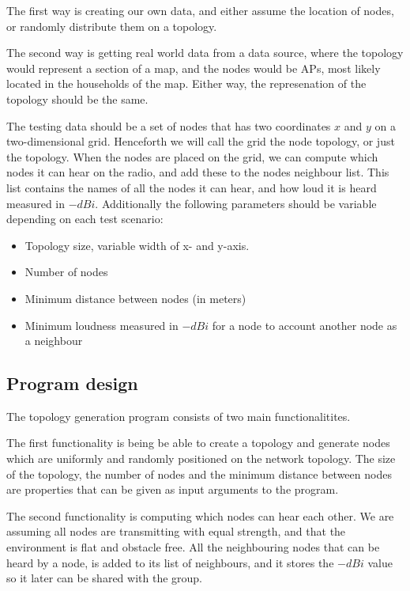     The first way is creating our own data, and either assume the location of nodes,
    or randomly distribute them on a topology.

    The second way is getting real world data from a data source, where the topology would represent a section of a map, and the nodes would be APs,
    most likely located in the households of the map.
    Either way, the represenation of the topology should be the same. 

    The testing data should be a set of nodes that has two coordinates $x$ and $y$ on a two-dimensional grid. Henceforth we will call the grid 
    the node topology, or just the topology. When the nodes are placed on the
    grid, we can compute which nodes it can hear on the radio, and add these to the nodes neighbour list. This list contains the
    names of all the nodes it can hear, and how loud it is heard measured in $-dBi$. Additionally
    the following parameters should be variable depending on each test scenario:
    \begin{itemize}
    \item Topology size, variable width of x- and y-axis.
	\item Number of nodes
\item Minimum distance between nodes (in meters)
	\item Minimum loudness measured in $-dBi$ for a node to account another node as a neighbour
	\end{itemize}

	\subsection{Program design}
	The topology generation program consists of two main functionalitites.

	The first functionality is being  be able to create a topology and generate nodes which are uniformly
	and randomly positioned on the network topology. The size of the topology, the number of nodes and the minimum distance
	between nodes are properties that can be given as input arguments to the program. 

	The second functionality is computing which nodes can hear each other. We are assuming all nodes
	are transmitting with equal strength, and that the environment is flat and obstacle free. 
	All the neighbouring nodes that can be heard by a node, is added to its list of neighbours, and it stores the $-dBi$ value so it later can be shared with
	the group. 

